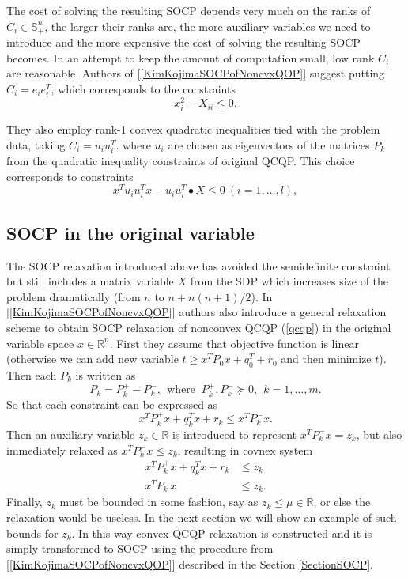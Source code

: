 \documentclass[12pt]{book}
\theoremstyle{definition}
\begin{document}
The cost of solving the resulting SOCP depends very much on the ranks of $C_i \in \mathbb{S}^n_+$, 
the larger their ranks are, the more auxiliary variables we need to 
introduce and the more expensive the cost of solving the resulting SOCP becomes. In an
attempt to keep the amount of computation small, low rank $C_i$ are
reasonable. Authors of [\ref{KimKojimaSOCPofNoncvxQOP}] suggest putting $C_i = e_ie_i^T$, which corresponds to the constraints
\begin{equation}
x_i^2 - X_{ii} \leq 0.
\end{equation}

They also employ rank-1 convex quadratic inequalities tied with the problem data, taking $C_i = u_iu^T_i$. 
where $u_i$ are chosen as eigenvectors of the matrices $P_k$ from the quadratic inequality constraints of original QCQP. This choice corresponds to constraints
\begin{equation}
x^Tu_iu_i^Tx - u_iu_i^T\bullet X \leq 0 \ (i = 1,\dots ,l),
\end{equation}
 	


\subsection{SOCP in the original variable}

The SOCP relaxation introduced above has avoided the semidefinite constraint but still includes a matrix variable $X$ from the SDP which increases size of the problem dramatically (from $n$ to $n+ n(n+1)/2$). In [\ref{KimKojimaSOCPofNoncvxQOP}] authors also introduce a general relaxation scheme to obtain SOCP relaxation of nonconvex QCQP (\ref{qcqp}) in the original variable space $x\in \mathbb{R}^n$. First they assume that objective function is linear (otherwise we can add new variable $t\geq x^TP_0x + q_0^T + r_0$ and then minimize $t$). Then each $P_k$ is written as 
$$P_k=P_k^+ -P_k^-, \ \ \mbox{where } \ P_k^+, P_k^- \succeq 0, \ \ k=1,\dots ,m.$$ 
So that each constraint can be expressed as 
\begin{equation}
x^TP_k^+x + q_k^Tx + r_k \leq x^TP_k^-x.
\end{equation}
Then an auxiliary variable $z_k\in \mathbb{R}$ is introduced to represent $x^TP_k^-x = z_k$, but also immediately relaxed as $x^TP_k^-x \leq z_k$, resulting in covnex system
\begin{equation}
\begin{array}{rl}
x^TP_k^+x + q_k^Tx + r_k &\leq z_k  \\
x^TP_k^-x & \leq z_k.
\end{array} 
\end{equation}
Finally, $z_k$ must be bounded in some fashion, say as $z_k\leq \mu \in \mathbb{R}$, or else the relaxation would be useless. In the next section we will show an example of such bounds for $z_k$.
In this way convex QCQP relaxation is constructed and it is simply transformed to SOCP using the procedure from [\ref{KimKojimaSOCPofNoncvxQOP}] described in the Section \ref{SectionSOCP}. 
\end{document}
